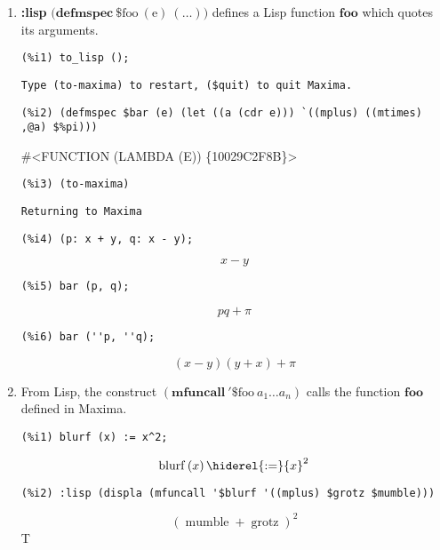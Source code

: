 \documentclass[12pt,leqno]{article}
\begin{document}
\begin{enumerate}
\item {\bf :lisp} $\mathrm{(}\mathbf{defmspec\ } \mathrm{\$foo\ (e)\ (\ldots))}$
defines a Lisp function $\mathbf{foo}$ which quotes its arguments.
\begin{verbatim}
(%i1) to_lisp ();
\end{verbatim}
\begin{Verbatim}
Type (to-maxima) to restart, ($quit) to quit Maxima.
\end{Verbatim}
\begin{verbatim}
(%i2) (defmspec $bar (e) (let ((a (cdr e))) `((mplus) ((mtimes) ,@a) $%pi)))
\end{verbatim}
\#\textless FUNCTION (LAMBDA (E)) \{10029C2F8B\}\textgreater 
\begin{verbatim}
(%i3) (to-maxima)
\end{verbatim}
\begin{Verbatim}
Returning to Maxima
\end{Verbatim}
\begin{verbatim}
(%i4) (p: x + y, q: x - y);
\end{verbatim}
\begin{dmath}[number={\(\mathop{\mathrm{\%o}_{2}}\)}]
x-y
\end{dmath}
\begin{verbatim}
(%i5) bar (p, q);
\end{verbatim}
\begin{dmath}[number={\(\mathop{\mathrm{\%o}_{3}}\)}]
p q+\pi
\end{dmath}
\begin{verbatim}
(%i6) bar (''p, ''q);
\end{verbatim}
\begin{dmath}[number={\(\mathop{\mathrm{\%o}_{4}}\)}]
\left(x-y\right) \left(y+x\right)+\pi
\end{dmath}


\item From Lisp, the construct $(\mathbf{mfuncall\ '\$}\mathrm{foo\ }a_1 \ldots a_n)$
calls the function $\mathbf{foo}$ defined in Maxima.

\begin{verbatim}
(%i1) blurf (x) := x^2;
\end{verbatim}
\begin{dmath}[number={\(\mathop{\mathrm{\%o}_{1}}\)}]
\mathop{\mathrm{blurf}}\left(x\right) \hiderel{:=} {x}^{2}
\end{dmath}
\begin{verbatim}
(%i2) :lisp (displa (mfuncall '$blurf '((mplus) $grotz $mumble)))
\end{verbatim}
\begin{dmath*}
{\left(\mathop{\mathrm{mumble}}+\mathop{\mathrm{grotz}}\right)}^{2}
\end{dmath*}
T

\end{enumerate}
\end{document}
